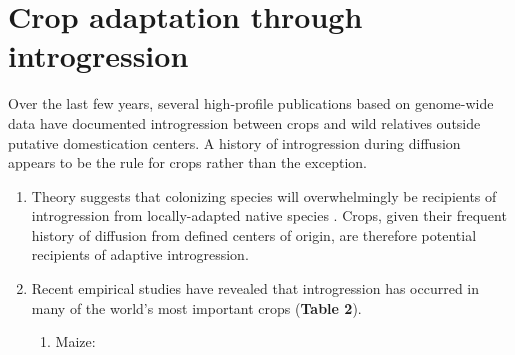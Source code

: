 \documentclass[11pt]{article}
\begin{document}
\section*{Crop adaptation through introgression}
Over the last few years, several high-profile publications based on genome-wide data have documented introgression between crops and wild relatives outside putative domestication centers.
A history of introgression during diffusion appears to be the rule for crops rather than the exception.
\begin{enumerate}
	\item{Theory suggests that colonizing species will overwhelmingly be recipients of introgression from locally-adapted native species \cite{Currat2008}. Crops, given their frequent history of diffusion from defined centers of origin, are therefore potential recipients of adaptive introgression.}
	\item{Recent empirical studies have revealed that introgression has occurred in many of the world's most important crops (\textbf{Table 2}).}






\begin{enumerate}
\item{Maize:}







\end{enumerate}
\end{enumerate}
\end{document}
